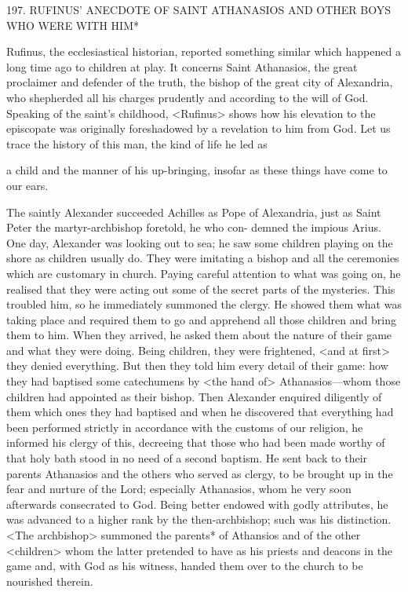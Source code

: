 197.
RUFINUS' ANECDOTE OF SAINT ATHANASIOS
AND OTHER BOYS WHO WERE WITH HIM*

Rufinus, the ecclesiastical historian, reported something similar
which happened a long time ago to children at play.
It concerns
Saint Athanasios, the great proclaimer and defender of the truth, the
bishop of the great city of Alexandria, who shepherded all his
charges prudently and according to the will of God.
Speaking of the
saint's childhood, <Rufinus> shows how his elevation to the
episcopate was originally foreshadowed by a revelation to him from
God.
Let us trace the history of this man, the kind of life he led as

a child and the manner of his up-bringing, insofar as these things
have come to our ears.

The saintly Alexander succeeded Achilles as Pope of Alexandria,
just as Saint Peter the martyr-archbishop foretold, he who con-
demned the impious Arius.
One day, Alexander was looking out to
sea; he saw some children playing on the shore as children usually
do.
They were imitating a bishop and all the ceremonies which are
customary in church.
Paying careful attention to what was going on,
he realised that they were acting out some of the secret parts of the
mysteries.
This troubled him, so he immediately summoned the
clergy.
He showed them what was taking place and required them
to go and apprehend all those children and bring them to him.
When they arrived, he asked them about the nature of their game
and what they were doing.
Being children, they were frightened,
<and at first> they denied everything.
But then they told him every
detail of their game: how they had baptised some catechumens by
<the hand of> Athanasios—whom those children had appointed as
their bishop.
Then Alexander enquired diligently of them which ones
they had baptised and when he discovered that everything had been
performed strictly in accordance with the customs of our religion,
he informed his clergy of this, decreeing that those who had been
made worthy of that holy bath stood in no need of a second
baptism.
He sent back to their parents Athanasios and the others
who served as clergy, to be brought up in the fear and nurture of
the Lord; especially Athanasios, whom he very soon afterwards
consecrated to God.
Being better endowed with godly attributes, he
was advanced to a higher rank by the then-archbishop; such was his
distinction.
<The archbishop> summoned the parents* of Athansios
and of the other <children> whom the latter pretended to have as
his priests and deacons in the game and, with God as his witness,
handed them over to the church to be nourished therein.

